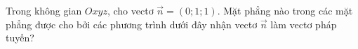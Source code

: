 \begin{ex}
Trong không gian $Oxyz$, cho vectơ $\vec n=(0;1;1)$. Mặt phẳng nào trong các mặt phẳng được cho bởi các phương trình dưới đây nhận vectơ $\vec n$ làm vectơ pháp tuyến?
\end{ex}
